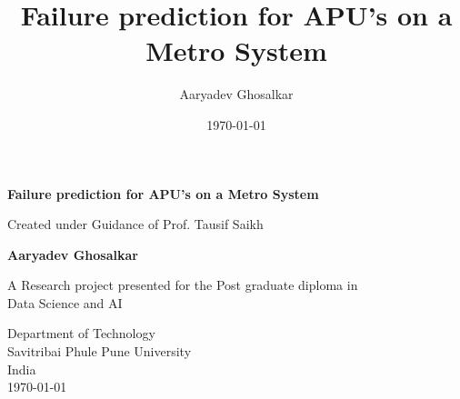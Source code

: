 \documentclass{article}
\title{Failure prediction for APU's on a Metro System}
\author{Aaryadev Ghosalkar}
\date{\today}
\begin{document}
\begin{titlepage}
    \begin{center}
        \vspace*{1cm}
            
        \Huge
        \textbf{Failure prediction for APU's on a Metro System}
            
        \vspace{0.5cm}
        \LARGE
        Created under Guidance of Prof. Tausif Saikh
            
        \vspace{1.5cm}
            
        \textbf{Aaryadev Ghosalkar}
            
        \vfill
            
        A Research project presented for the Post graduate diploma in\\
        Data Science and AI
            
        \vspace{0.8cm}
            
        \Large
        Department of Technology\\
        Savitribai Phule Pune University\\
        India\\
        \today
            
    \end{center}
\end{titlepage}


\maketitle
\end{document}
